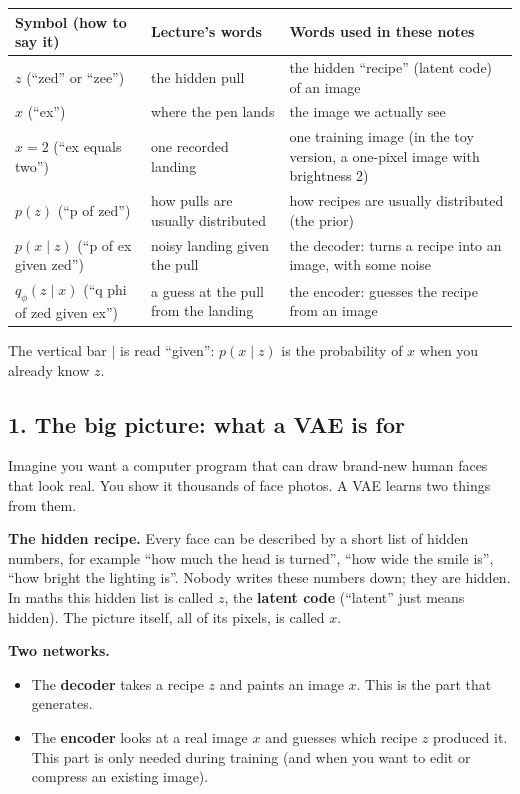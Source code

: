 \begin{center}
\begin{tabular}{>{\raggedright\arraybackslash}p{} >{\raggedright\arraybackslash}p{} >{\raggedright\arraybackslash}p{}}
\toprule
Symbol (how to say it) & Lecture's words & Words used in these notes \\
\midrule
$z$ (``zed'' or ``zee'') & the hidden pull & the hidden ``recipe'' (latent code) of an image \\
$x$ (``ex'') & where the pen lands & the image we actually see \\
$x = 2$ (``ex equals two'') & one recorded landing & one training image (in the toy version, a one-pixel image with brightness 2) \\
$p(z)$ (``p of zed'') & how pulls are usually distributed & how recipes are usually distributed (the prior) \\
$p(x \mid z)$ (``p of ex given zed'') & noisy landing given the pull & the decoder: turns a recipe into an image, with some noise \\
$q_\phi(z \mid x)$ (``q phi of zed given ex'') & a guess at the pull from the landing & the encoder: guesses the recipe from an image \\
\bottomrule
\end{tabular}
\end{center}

The vertical bar $\mid$ is read ``given'': $p(x \mid z)$ is the probability of $x$ when you already know $z$.

\subsection*{1. The big picture: what a VAE is for}

Imagine you want a computer program that can draw brand-new human faces that look real. You show it thousands of face photos. A VAE learns two things from them.

\textbf{The hidden recipe.} Every face can be described by a short list of hidden numbers, for example ``how much the head is turned'', ``how wide the smile is'', ``how bright the lighting is''. Nobody writes these numbers down; they are hidden. In maths this hidden list is called $z$, the \textbf{latent code} (``latent'' just means hidden). The picture itself, all of its pixels, is called $x$.

\textbf{Two networks.}
\begin{itemize}[leftmargin=1.5em]
\item The \textbf{decoder} takes a recipe $z$ and paints an image $x$. This is the part that generates.
\item The \textbf{encoder} looks at a real image $x$ and guesses which recipe $z$ produced it. This part is only needed during training (and when you want to edit or compress an existing image).
\end{itemize}

